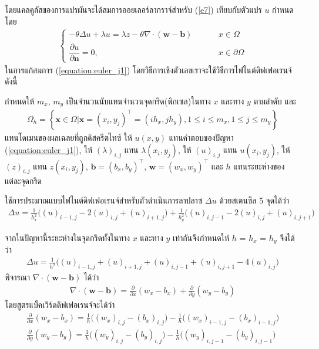 \hspace{1cm}  โดยแคลคูลัสของการแปรผันจะได้สมการออยเลอร์ลากราจ์สำหรับ (\ref{e7}) เทียบกับตัวแปร $u$ กำหนดโดย
\begin{align}
\left \{ \begin{array}{ll}   - \theta \Delta u + \lambda u = \lambda z - \theta \nabla \cdot (\boldsymbol{w}-\boldsymbol{b}) & \hspace{1cm} x \in  \Omega 	 \\
 \dfrac{\partial u}{\partial \boldsymbol{n}} = 0, & \hspace{1cm} x \in \partial \Omega \end{array} \right . 
 \label{equation:euler_j1}
\end{align}
\hspace{1cm} ในการแก้สมการ (\ref{equation:euler_j1}) โดยวิธีการเชิงตัวเลขเราจะใช้วิธีการไฟไนต์ดิฟเฟอเรนจ์ดังนี้

\hspace{1cm} กำหนดให้ $m_x$, $m_y$ เป็นจำนวนนับแทนจำนวนจุดกริด(พิกเซล)ในทาง $x$ และทาง $y$ ตามลำดับ และ
\begin{align*}
	\Omega_{h}=\left\{ \mathbf{x} \in \Omega | \mathbf{x}=(x_i,y_j)^{\top} = (ih_x,jh_y), 1 \leq i \leq m_x, 1 \leq j \leq m_y  \right\}
\end{align*}
แทนโดเมนของผลเฉลยที่ถูกดิสครีตไทซ์ ให้ $u(x,y)$ แทนคำตอบของปัญหา  (\ref{equation:euler_j1}), ให้ $(\lambda)_{i,j}$ แทน $\lambda(x_i,y_j)$,   ให้ $(u)_{i,j}$ แทน $u(x_i,y_j)$, ให้ $(z)_{i,j}$ แทน $z(x_i,y_j)$, $\boldsymbol{b} = (b_x,b_y)^\top$, $\boldsymbol{w}=(w_x,w_y)^\top$ และ $h$ แทนระยะห่างของแต่ละจุดกริด 

ใช้การประมาณแบบไฟไนต์ดิฟเฟอเรนจ์สำหรับตัวดำเนินการลาปลาซ $\Delta u$ ด้วยสเตนซิล 5 จุดได้ว่า
\begin{align}
	\Delta u = \frac{1}{h_x^2} \big( (u)_{i-1,j} - 2(u)_{i,j} + (u)_{i+1,j}\big) + \frac{1}{h_y^2} \big( (u)_{i,j-1} - 2(u)_{i,j} + (u)_{i,j+1}\big)
\end{align}

จากในปัญหานี้ระยะห่างในจุดกริดทั้งในทาง $x$ และทาง $y$ เท่ากันจึงกำหนดให้ $h$ = $h_x$ = $h_y$ จึงได้ว่า
\begin{align}
	\Delta u = \frac{1}{h^2} \big( (u)_{i-1,j} + (u)_{i+1,j} + (u)_{i,j-1} +  (u)_{i,j+1} - 4(u)_{i,j} \big)
\end{align}
พิจารณา $\nabla \cdot (\boldsymbol{w}-\boldsymbol{b})$ ได้ว่า
\begin{align}
	\nabla \cdot (\boldsymbol{w}-\boldsymbol{b}) = \frac{\partial}{\partial x} (w_x - b_x) + \frac{\partial}{\partial y} (w_y - b_y) 
\end{align}
โดยสูตรแบ็คเวิร์ดดิฟเฟอเรนจ์จะได้ว่า
\begin{align}
	\frac{\partial}{\partial x} (w_x-b_x)  =  \frac{1}{h} \Big((w_x)_{i,j}-(b_x)_{i,j}\Big) - \frac{1}{h} \Big((w_x)_{i-1,j}-(b_x)_{i-1,j}\Big)  \\ 
	\frac{\partial}{\partial y} (w_y-b_y)  =  \frac{1}{h} \Big((w_y)_{i,j}-(b_y)_{i,j}\Big) - \frac{1}{h} \Big((w_y)_{i,j-1}-(b_y)_{i,j-1}\Big) 
\end{align}

